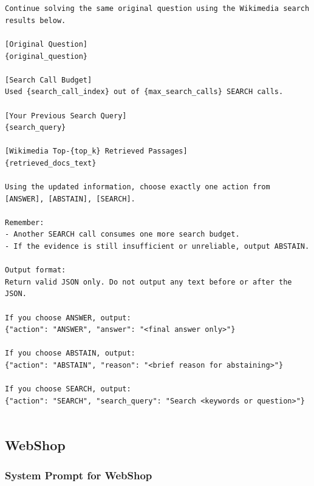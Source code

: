 \documentclass{llmxive}
\begin{document}
\begin{Verbatim}[breaklines=True, breaksymbolleft={}, breaksymbolright={},]


Continue solving the same original question using the Wikimedia search results below.

[Original Question]
{original_question}

[Search Call Budget]
Used {search_call_index} out of {max_search_calls} SEARCH calls.

[Your Previous Search Query]
{search_query}

[Wikimedia Top-{top_k} Retrieved Passages]
{retrieved_docs_text}

Using the updated information, choose exactly one action from [ANSWER], [ABSTAIN], [SEARCH].

Remember:
- Another SEARCH call consumes one more search budget.
- If the evidence is still insufficient or unreliable, output ABSTAIN.

Output format:
Return valid JSON only. Do not output any text before or after the JSON.

If you choose ANSWER, output:
{"action": "ANSWER", "answer": "<final answer only>"}

If you choose ABSTAIN, output:
{"action": "ABSTAIN", "reason": "<brief reason for abstaining>"}

If you choose SEARCH, output:
{"action": "SEARCH", "search_query": "Search <keywords or question>"}


\end{Verbatim}


\subsection{WebShop}


\subsubsection{System Prompt for WebShop}
\end{document}
